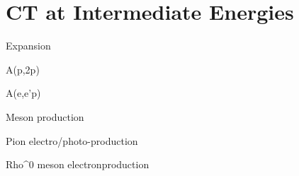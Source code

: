 \section{CT at Intermediate Energies}
Expansion

A(p,2p)

A(e,e'p)

Meson production

Pion electro/photo-production

Rho^0 meson electronproduction

